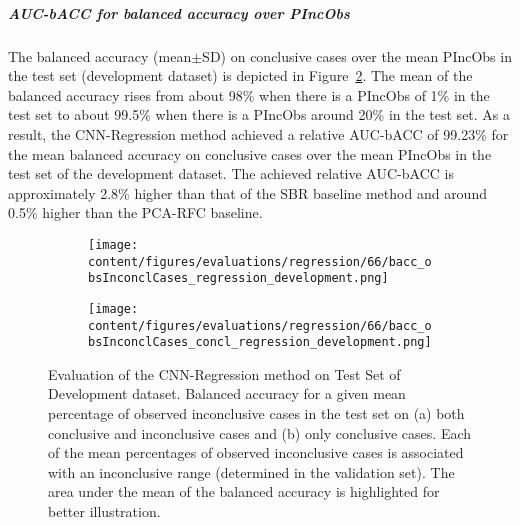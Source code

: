 \subparagraph{AUC-bACC for balanced accuracy over PIncObs}

The balanced accuracy (mean$\pm$SD) on conclusive cases over the mean PIncObs in the test set (development dataset) 
is depicted in Figure~\ref{fig:bacc_obsInconclCases_concl_regression_development}.
The mean of the balanced accuracy rises from about 98\% when there is a PIncObs of 1\% in the test set 
to about 99.5\% when there is a PIncObs around 20\% in the test set.
As a result, the CNN-Regression method achieved a relative AUC-bACC of 99.23\% for the mean balanced accuracy on conclusive cases
over the mean PIncObs in the test set of the development dataset.
The achieved relative AUC-bACC is approximately 2.8\% higher than that of the SBR baseline method 
and around 0.5\% higher than the PCA-RFC baseline.


\begin{figure}[ht]
  \begin{subfigure}{0.5\textwidth}
    \centering
    \texttt{[image: content/figures/evaluations/regression/66/bacc\_obsInconclCases\_regression\_development.png]}
    \subcaption{}
    \label{fig:bacc_obsInconclCases_regression_development}
  \end{subfigure}
  \hfill
  \begin{subfigure}{0.5\textwidth}
    \centering
    \texttt{[image: content/figures/evaluations/regression/66/bacc\_obsInconclCases\_concl\_regression\_development.png]}
    \subcaption{}
    \label{fig:bacc_obsInconclCases_concl_regression_development}
  \end{subfigure}

  \caption{Evaluation of the CNN-Regression method on Test Set of Development dataset.
  Balanced accuracy for a given mean percentage of observed inconclusive cases in the test set on 
  (a) both conclusive and inconclusive cases and (b) only conclusive cases. 
  Each of the mean percentages of observed inconclusive cases is associated with an inconclusive range (determined in the validation set). 
  The area under the mean of the balanced accuracy is highlighted for better illustration.}
  \label{fig:bacc_obsInconclCases_regression_development_full}
\end{figure}



